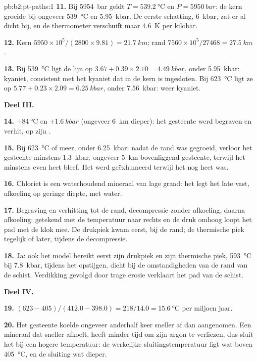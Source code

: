 \begin{solution}{pb:b2:pt-paths:1}
\textbf{11.} Bij \qty{5954}{bar} geldt $T = \qty{539.2}{\celsius}$ en $P = \qty{5950}{bar}$: de
kern groeide bij ongeveer \qty{539}{\celsius} en \qty{5.95}{kbar}. De eerste schatting,
\qty{6}{kbar}, zat er al dicht bij, en de thermometer verschuift maar \qty{4.6}{K} per kilobar.

\textbf{12.} Kern $5950\times10^5/(2800\times9.81) = \qty{21.7}{km}$; rand
$7560\times10^5/27468 = \qty{27.5}{km}$.

\textbf{13.} Bij \qty{539}{\celsius} ligt de lijn op $3.67 + 0.39\times2.10 =
\qty{4.49}{kbar}$, onder \qty{5.95}{kbar}: kyaniet, consistent met het kyaniet dat in de
kern is ingesloten. Bij \qty{623}{\celsius} ligt ze op $5.77 + 0.23\times2.09 = \qty{6.25}{kbar}$,
onder \qty{7.56}{kbar}: weer kyaniet.

\noindent\textbf{Deel III.}

\textbf{14.} $+\qty{84}{\celsius}$ en $+\qty{1.6}{kbar}$ (ongeveer \qty{6}{km} dieper): het
gesteente werd begraven en verhit, op zijn .

\textbf{15.} Bij \qty{623}{\celsius} of meer, onder \qty{6.25}{kbar}: nadat de rand was gegroeid,
verloor het gesteente minstens \qty{1.3}{kbar}, ongeveer \qty{5}{km} bovenliggend gesteente, terwijl het minstens
even heet bleef. Het werd geëxhumeerd terwijl het nog heet was.

\textbf{16.} Chloriet is een waterhoudend mineraal van lage graad: het legt het late  vast, afkoeling op geringe diepte, met water.

\textbf{17.} Begraving en verhitting tot de rand, decompressie zonder afkoeling, daarna afkoeling:
getekend met de temperatuur naar rechts en de druk omhoog loopt het pad met de klok mee. De
drukpiek kwam eerst, bij de rand; de thermische piek tegelijk of later, tijdens de
decompressie.

\textbf{18.} Ja: ook het model bereikt eerst zijn drukpiek en zijn thermische piek,
\qty{593}{\celsius} bij \qty{7.8}{kbar}, tijdens het opstijgen, dicht bij de omstandigheden
van de rand van de schist. Verdikking gevolgd door trage erosie verklaart het pad van de schist.

\noindent\textbf{Deel IV.}

\textbf{19.} $(623 - 405)/(412.0 - 398.0) = 218/14.0 = \qty{15.6}{\celsius}$ per miljoen
jaar.

\textbf{20.} Het gesteente koelde ongeveer anderhalf keer sneller af dan aangenomen. Een mineraal
dat sneller afkoelt, heeft minder tijd om zijn argon te verliezen, dus sluit het bij een hogere temperatuur:
de werkelijke sluitingstemperatuur ligt wat boven \qty{405}{\celsius}, en de sluiting
wat dieper.


\end{solution}
